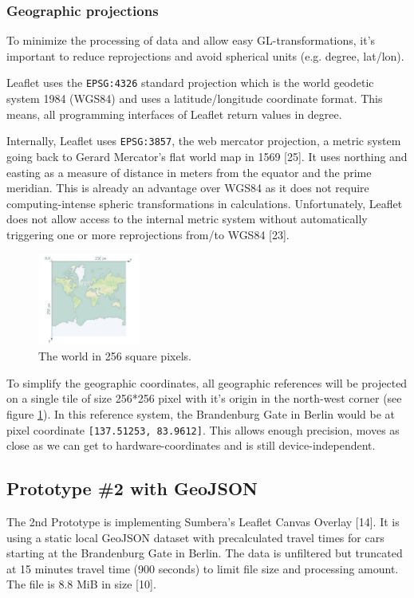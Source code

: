 \documentclass{motivation}
\begin{document}
\subsubsection{Geographic projections}
  \label{sec:pix}
  To minimize the processing of data and allow easy GL-transformations, it's important to reduce reprojections and avoid spherical units (e.g. degree, lat/lon).\par
  Leaflet uses the \texttt{EPSG:4326} standard projection which is the world geodetic system 1984 (WGS84) and uses a latitude/longitude coordinate format. This means, all programming interfaces of Leaflet return values in degree.\par
  Internally, Leaflet uses \texttt{EPSG:3857}, the web mercator projection, a metric system going back to Gerard Mercator's flat world map in 1569 [25]. It uses northing and easting as a measure of distance in meters from the equator and the prime meridian. This is already an advantage over WGS84 as it does not require computing-intense spheric transformations in calculations. Unfortunately, Leaflet does not allow access to the internal metric system without automatically triggering one or more reprojections from/to WGS84 [23].\par

  \begin{figure}[h]
    \centering
    \includegraphics[width=0.3\textwidth]{../pdf/earth-256.pdf}
    \caption{The world in 256 square pixels.}
    \label{fig:earth256}
  \end{figure}

  To simplify the geographic coordinates, all geographic references will be projected on a single tile of size 256*256 pixel with it's origin in the north-west corner (see figure \ref{fig:earth256}). In this reference system, the Brandenburg Gate in Berlin would be at pixel coordinate \texttt{[137.51253, 83.9612]}. This allows enough precision, moves as close as we can get to hardware-coordinates and is still device-independent.

\subsection{Prototype \#2 with GeoJSON}
  \label{sec:pt2}
  The 2nd Prototype is implementing Sumbera's Leaflet Canvas Overlay [14]. It is using a static local GeoJSON dataset with precalculated travel times for cars starting at the Brandenburg Gate in Berlin. The data is unfiltered but truncated at 15 minutes travel time (900 seconds) to limit file size and processing amount. The file is 8.8 MiB in size [10].
\end{document}
